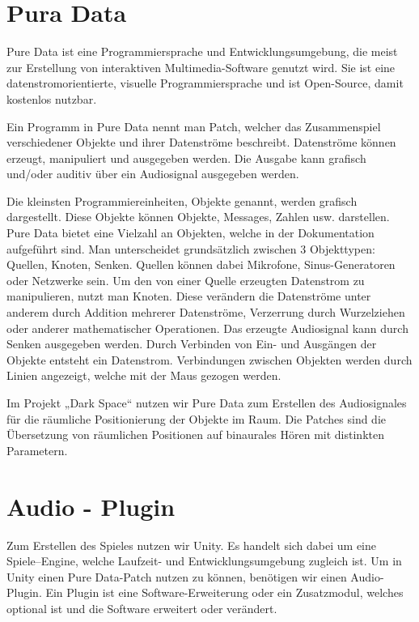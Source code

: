 \documentclass[a4paper, 11pt]{scrartcl}
\begin{document}
\section{Pura Data}
\label{sec:Pure Data}

Pure Data ist eine Programmiersprache und Entwicklungsumgebung, die meist zur
Erstellung von interaktiven Multimedia-Software genutzt wird. Sie ist eine
datenstromorientierte, visuelle Programmiersprache und ist Open-Source, damit
kostenlos nutzbar.

Ein Programm in Pure Data nennt man Patch, welcher das Zusammenspiel
verschiedener Objekte und ihrer Datenströme beschreibt. Datenströme können
erzeugt, manipuliert und ausgegeben werden. Die Ausgabe kann grafisch und/oder
auditiv über ein Audiosignal ausgegeben werden.  

Die kleinsten Programmiereinheiten, Objekte genannt, werden grafisch
dargestellt. Diese Objekte können Objekte, Messages, Zahlen usw. darstellen.
Pure Data bietet eine Vielzahl an Objekten, welche in der Dokumentation
aufgeführt sind. Man unterscheidet grundsätzlich zwischen 3 Objekttypen:
Quellen, Knoten, Senken. Quellen können dabei Mikrofone, Sinus-Generatoren oder
Netzwerke sein. Um den von einer Quelle erzeugten Datenstrom zu manipulieren,
nutzt man Knoten. Diese verändern die Datenströme unter anderem durch Addition
mehrerer Datenströme, Verzerrung durch Wurzelziehen oder anderer mathematischer
Operationen. Das erzeugte Audiosignal kann durch Senken ausgegeben werden. Durch
Verbinden von Ein- und Ausgängen der Objekte entsteht ein Datenstrom.
Verbindungen zwischen Objekten werden durch Linien angezeigt, welche mit der
Maus gezogen werden. 

Im Projekt „Dark Space“ nutzen wir Pure Data zum Erstellen des Audiosignales für
die räumliche Positionierung der Objekte im Raum. Die Patches sind die
Übersetzung von räumlichen Positionen auf binaurales Hören mit distinkten
Parametern. 

\section{Audio - Plugin} \label{sec:Audio - Plugin}

Zum Erstellen des Spieles nutzen wir Unity. Es handelt sich dabei um eine
Spiele–Engine, welche Laufzeit- und Entwicklungsumgebung zugleich ist. Um in
Unity einen Pure Data-Patch nutzen zu können, benötigen wir einen Audio-Plugin.
Ein Plugin ist eine Software-Erweiterung oder ein Zusatzmodul, welches optional
ist und die Software erweitert oder verändert. 
\end{document}

